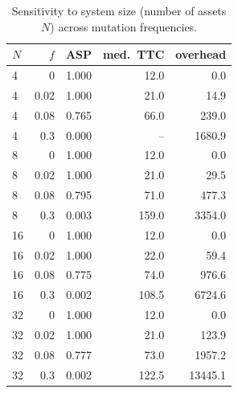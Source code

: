 \begin{table}[t]
\centering
\caption{Sensitivity to system size (number of assets $N$) across mutation frequencies.}
\label{tab:sensitivity_size}
\begin{tabular}{lrrrr}
\toprule
$N$ & $f$ & ASP & med.\ TTC & overhead \\
\midrule
4 & 0 & 1.000 & 12.0 & 0.0 \\
4 & 0.02 & 1.000 & 21.0 & 14.9 \\
4 & 0.08 & 0.765 & 66.0 & 239.0 \\
4 & 0.3 & 0.000 & -- & 1680.9 \\
8 & 0 & 1.000 & 12.0 & 0.0 \\
8 & 0.02 & 1.000 & 21.0 & 29.5 \\
8 & 0.08 & 0.795 & 71.0 & 477.3 \\
8 & 0.3 & 0.003 & 159.0 & 3354.0 \\
16 & 0 & 1.000 & 12.0 & 0.0 \\
16 & 0.02 & 1.000 & 22.0 & 59.4 \\
16 & 0.08 & 0.775 & 74.0 & 976.6 \\
16 & 0.3 & 0.002 & 108.5 & 6724.6 \\
32 & 0 & 1.000 & 12.0 & 0.0 \\
32 & 0.02 & 1.000 & 21.0 & 123.9 \\
32 & 0.08 & 0.777 & 73.0 & 1957.2 \\
32 & 0.3 & 0.002 & 122.5 & 13445.1 \\
\bottomrule
\end{tabular}
\end{table}
